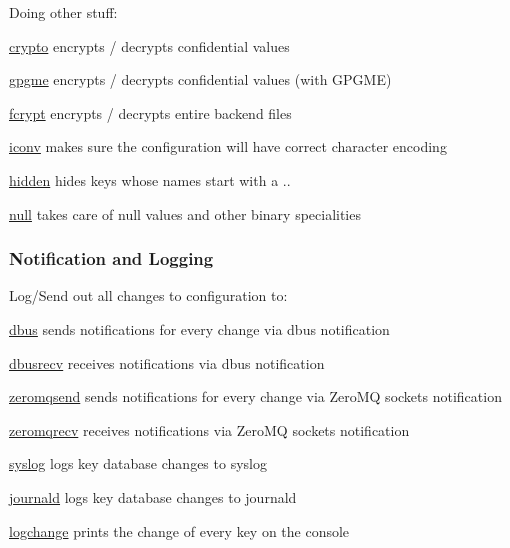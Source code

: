 Doing other stuff\+:


\begin{DoxyItemize}
\item \hyperlink{md_src_plugins_crypto_README_src_plugins_crypto_README_md}{crypto} encrypts / decrypts confidential values
\item \hyperlink{md_src_plugins_gpgme_README_src_plugins_gpgme_README_md}{gpgme} encrypts / decrypts confidential values (with G\+P\+G\+ME)
\item \hyperlink{md_src_plugins_fcrypt_README_src_plugins_fcrypt_README_md}{fcrypt} encrypts / decrypts entire backend files
\item \hyperlink{md_src_plugins_iconv_README_src_plugins_iconv_README_md}{iconv} makes sure the configuration will have correct character encoding
\item \hyperlink{md_src_plugins_hidden_README_src_plugins_hidden_README_md}{hidden} hides keys whose names start with a {\ttfamily .}.
\item \hyperlink{md_src_plugins_null_README_src_plugins_null_README_md}{null} takes care of null values and other binary specialities
\end{DoxyItemize}

\subsubsection*{Notification and Logging}

Log/\+Send out all changes to configuration to\+:


\begin{DoxyItemize}
\item \hyperlink{md_src_plugins_dbus_README_src_plugins_dbus_README_md}{dbus} sends notifications for every change via dbus {\ttfamily notification}
\item \hyperlink{md_src_plugins_dbusrecv_README_src_plugins_dbusrecv_README_md}{dbusrecv} receives notifications via dbus {\ttfamily notification}
\item \hyperlink{md_src_plugins_zeromqsend_README_src_plugins_zeromqsend_README_md}{zeromqsend} sends notifications for every change via Zero\+MQ sockets {\ttfamily notification}
\item \hyperlink{md_src_plugins_zeromqrecv_README_src_plugins_zeromqrecv_README_md}{zeromqrecv} receives notifications via Zero\+MQ sockets {\ttfamily notification}
\item \hyperlink{md_src_plugins_syslog_README_src_plugins_syslog_README_md}{syslog} logs key database changes to syslog
\item \hyperlink{md_src_plugins_journald_README_src_plugins_journald_README_md}{journald} logs key database changes to journald
\item \hyperlink{md_src_plugins_logchange_README_src_plugins_logchange_README_md}{logchange} prints the change of every key on the console
\end{DoxyItemize}

